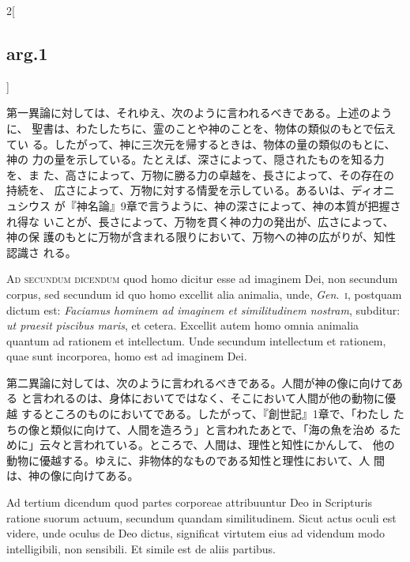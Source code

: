 \documentclass[paper=a4paper,fontsize=10pt,jafontsize=9pt,titlepage]{jlreq}
\begin{document}
\begin{paracol}{2}[\subsection{arg.1}]
\switchcolumn

第一異論に対しては、それゆえ、次のように言われるべきである。上述のように、
聖書は、わたしたちに、霊のことや神のことを、物体の類似のもとで伝えてい
る。したがって、神に三次元を帰するときは、物体の量の類似のもとに、神の
力の量を示している。たとえば、深さによって、隠されたものを知る力を、ま
た、高さによって、万物に勝る力の卓越を、長さによって、その存在の持続を、
広さによって、万物に対する情愛を示している。あるいは、ディオニュシウス
が『神名論』9章で言うように、神の深さによって、神の本質が把握され得な
いことが、長さによって、万物を貫く神の力の発出が、広さによって、神の保
護のもとに万物が含まれる限りにおいて、万物への神の広がりが、知性認識さ
れる。

\switchcolumn*[\subsection{ad.2}]

{\scshape Ad secundum dicendum} quod homo dicitur esse ad imaginem Dei, non
secundum corpus, sed secundum id quo homo excellit alia animalia,
unde, {\itshape Gen}.~{\scshape i}, postquam dictum est: {\itshape Faciamus hominem
ad imaginem et similitudinem nostram}, subditur: {\itshape ut praesit
piscibus maris}, et cetera. Excellit autem homo omnia animalia quantum
ad rationem et intellectum. Unde secundum intellectum et rationem,
quae sunt incorporea, homo est ad imaginem Dei.

\switchcolumn

第二異論に対しては、次のように言われるべきである。人間が神の像に向けてある
と言われるのは、身体においてではなく、そこにおいて人間が他の動物に優越
するところのものにおいてである。したがって、『創世記』1章で、「わたし
たちの像と類似に向けて、人間を造ろう」と言われたあとで、「海の魚を治め
るために」云々と言われている。ところで、人間は、理性と知性にかんして、
他の動物に優越する。ゆえに、非物体的なものである知性と理性において、人
間は、神の像に向けてある。

\switchcolumn*[\subsection{ad.3}]

Ad tertium dicendum quod partes corporeae attribuuntur Deo in
Scripturis ratione suorum actuum, secundum quandam
similitudinem. Sicut actus oculi est videre, unde oculus de Deo
dictus, significat virtutem eius ad videndum modo intelligibili, non
sensibili. Et simile est de aliis partibus.


\end{paracol}
\end{document}
